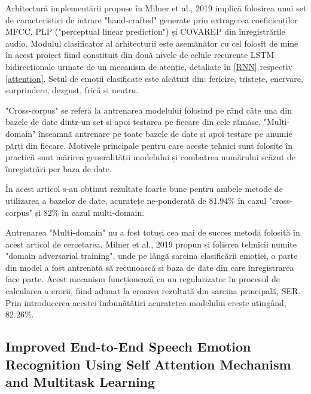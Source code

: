 \documentclass[a4paper,12pt]{book}
\begin{document}
					Arhitectură implementării propuse în Milner et al., 2019 \cite{multi-domain} implică folosirea unui set de caracteristici de intrare "hand-crafted" generate prin extragerea coeficienților MFCC, PLP ("perceptual linear prediction") și COVAREP \cite{covarep} din înregistrările audio. Modulul clasificator al arhitecturii este asemănător cu cel folosit de mine în acest proiect fiind constituit din două nivele de celule recurente LSTM bidirecționale  urmate de un mecanism de atenție, detaliate în \ref{RNN} respectiv \ref{attention}. Setul de emoții clasificate este alcătuit din: fericire, tristețe, enervare, surprindere, dezgust, frică și neutru. \par
					
					"Cross-corpus" se referă la antrenarea modelului folosind pe rând câte una din bazele de date dintr-un set și apoi testarea pe fiecare din cele rămase. "Multi-domain" înseamnă antrenare pe toate bazele de date și apoi testare pe anumie părți din fiecare. Motivele principale pentru care aceste tehnici sunt folosite în practică sunt mărirea generalității modelului și combatrea numărului scăzut de înregistrări per baza de date. \par
					
					În acest articol s-au obținut rezultate foarte bune pentru ambele metode de utilizarea a bazelor de date, acuratețe ne-ponderată de  81.94\% în cazul "cross-corpus" și 82\% în cazul multi-domain. \par					
					
					Antrenarea "Multi-domain" nu a fost totuși cea mai de succes metodă folosită în acest articol de cercetarea. Milner et al., 2019 \cite{multi-domain} propun și folisrea tehnicii numite "domain adversarial training", unde pe lângă sarcina clasificării emoției, o parte din model a fost antrenată să recunoască și baza de date din care înregistrarea face parte. Acest mecanism funcționează ca un regularizator în procesul de calcularea a erorii, fiind adunat la eroarea rezultată din sarcina principală, SER. Prin introducerea acestei îmbunătățiri acuratețea modelului crește atingând, 82.26\%. \par
						
					\subsection{Improved End-to-End Speech Emotion Recognition Using Self Attention	Mechanism and Multitask Learning} \label{end-to-end2}
					
\end{document}
